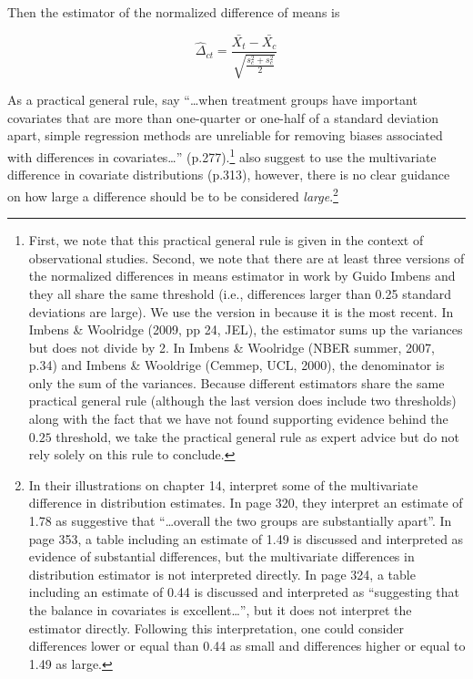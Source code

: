 Then the estimator of the normalized difference of means is

\begin{equation*}
  \hat{\Delta}_{ct}=
    \frac{\bar{X_t}-\bar{X_c}}
         {\sqrt{\frac{s_c^2+s_c^2}{2}}}
\end{equation*}


As a practical general rule, \citet{imbensCausalInferenceStatistics2015} say \enquote{\ldots when treatment groups have important covariates that are more than one-quarter or one-half of a standard deviation apart, simple regression methods are unreliable for removing biases associated with differences in covariates\ldots} (p.277).\footnote{First, we note that this practical general rule is given in the context of observational studies. Second, we note that there are at least three versions of the normalized differences in means estimator in work by Guido Imbens and they all share the same threshold (i.e., differences larger than 0.25 standard deviations are large). We use the version in \citet{imbensCausalInferenceStatistics2015} because it is the most recent. In Imbens \& Woolridge (2009, pp 24, JEL), the estimator sums up the variances but does not divide by 2. In Imbens \& Woolridge (NBER summer, 2007, p.34) and Imbens \& Wooldrige (Cemmep, UCL, 2000), the denominator is only the sum of the variances. Because different estimators share the same practical general rule (although the last version does include two thresholds) along with the fact that we have not found supporting evidence behind the $0.25$ threshold, we take the practical general rule as expert advice but do not rely solely on this rule to conclude.} \citet{imbensCausalInferenceStatistics2015} also suggest to use the multivariate difference in covariate distributions (p.313), however, there is no clear guidance on how large a difference should be to be considered \emph{large}.\footnote{In their illustrations on chapter 14, \citet{imbensCausalInferenceStatistics2015} interpret some of the multivariate difference in distribution estimates. In page 320, they interpret an estimate of 1.78 as suggestive that \enquote{\ldots overall the two groups are substantially apart}. In page 353, a table including an estimate of 1.49 is discussed and interpreted as evidence of substantial differences, but the multivariate differences in distribution estimator is not interpreted directly. In page 324, a table including an estimate of 0.44 is discussed and interpreted as \enquote{suggesting that the balance in covariates is excellent\ldots}, but it does not interpret the estimator directly. Following this interpretation, one could consider differences lower or equal than 0.44 as small and differences higher or equal to 1.49 as large.}

